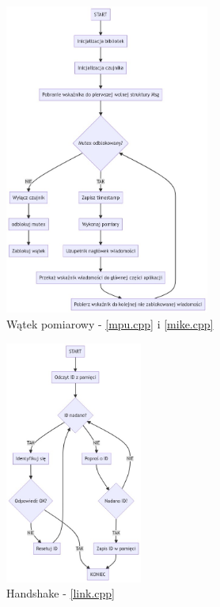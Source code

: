 \documentclass[12pt,oneside,a4paper]{book}
\theoremstyle{break}
\begin{document}
\begin{figure}[H]
    \begin{center}
        \includegraphics[width=0.6\textwidth]{uc-measurement_task}
        \caption{Wątek pomiarowy - \ref*{mpu.cpp} i \ref*{mike.cpp}}
        \label{rys:uc-measurement_task}
    \end{center}
\end{figure}

\begin{figure}[H]
    \begin{center}
        \includegraphics[width=0.4\textwidth]{uc-handshake}
        \caption{Handshake - \ref*{link.cpp}}
        \label{rys:uc-handshake}
    \end{center}
\end{figure}
\end{document}

